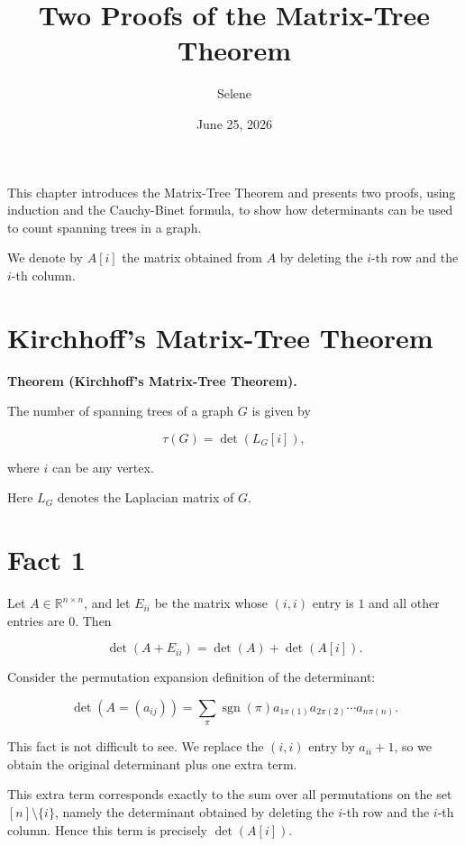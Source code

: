 \documentclass[
  a4paper,
  10pt]{article}
\title{Two Proofs of the Matrix-Tree Theorem}
\author{Selene}
\date{June 25, 2026}
\newenvironment{theorembox}[1]
  {\par\medskip\noindent\textbf{Theorem (#1).}\quad}
  {\par\medskip}
\begin{document}
\maketitle

This chapter introduces the Matrix-Tree Theorem and presents two proofs,
using induction and the Cauchy-Binet formula, to show how determinants
can be used to count spanning trees in a graph.

We denote by \(A[i]\) the matrix obtained from \(A\) by deleting the
\(i\)-th row and the \(i\)-th column.

\section{Kirchhoff's Matrix-Tree
Theorem}\label{kirchhoffs-matrix-tree-theorem}

\begin{theorembox}{Kirchhoff's Matrix-Tree Theorem}

The number of spanning trees of a graph \(G\) is given by

\[
\tau(G)=\det(L_G[i]),
\]

where \(i\) can be any vertex.

\end{theorembox}

Here \(L_G\) denotes the Laplacian matrix of \(G\).

\section{Fact 1}\label{fact-1}

Let \(A \in \mathbb{R}^{n \times n}\), and let \(E_{ii}\) be the matrix
whose \((i,i)\) entry is \(1\) and all other entries are \(0\). Then

\[
\det(A + E_{ii})
=
\det(A) + \det(A[i]).
\]

Consider the permutation expansion definition of the determinant:

\[
\det(A=(a_{ij}))
=
\sum_{\pi}
\operatorname{sgn}(\pi)
a_{1\pi(1)}
a_{2\pi(2)}
\cdots
a_{n\pi(n)}.
\]

This fact is not difficult to see. We replace the \((i,i)\) entry by
\(a_{ii}+1\), so we obtain the original determinant plus one extra term.

This extra term corresponds exactly to the sum over all permutations on
the set \([n]\setminus\{i\}\), namely the determinant obtained by
deleting the \(i\)-th row and the \(i\)-th column. Hence this term is
precisely \(\det(A[i])\).
\end{document}

